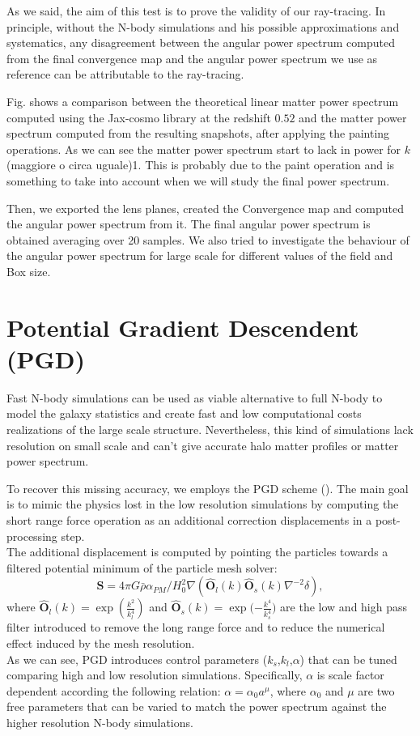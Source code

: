 \documentclass[twocolumn,twocolappendix]{aastex63}
\begin{document}
As we said, the aim of this test is to prove the validity of our ray-tracing. In principle, without the N-body simulations and his possible approximations and systematics, any disagreement between the angular power spectrum computed from the final convergence map
and the angular power spectrum we use as reference can be attributable to the ray-tracing.

Fig. shows a comparison between the theoretical linear matter power spectrum computed using the Jax-cosmo library at the redshift $0.52$ and the matter power spectrum computed from the resulting snapshots, after applying the painting operations. As we can see the matter power spectrum start to lack in power for $k$(maggiore o circa uguale)1. This is probably due to the paint operation and is something to take into account when we will study the final power spectrum.

Then, we exported the lens planes, created the Convergence map and computed the angular power spectrum from it. The final angular power spectrum is obtained averaging over 20 samples.
We also tried to investigate the behaviour of the angular power spectrum for large scale for different values of the field and Box size.

\section{Potential Gradient Descendent (PGD)}    
Fast N-body simulations can be used as viable alternative to full N-body to model the galaxy statistics and create fast and low computational costs realizations of the large scale structure. Nevertheless, this kind of simulations lack resolution on small scale and can't give accurate halo matter profiles or matter power spectrum. 


To recover this missing accuracy, we employs the PGD scheme (\citet{Dai_2018}). 
The main goal is to mimic the physics lost in the low resolution simulations by computing the short range force operation as an additional correction displacements in a post-processing step. \\
The additional displacement is computed by pointing the particles towards a filtered potential minimum of the particle mesh solver:
\begin{equation}
    \textbf{S}=4\pi G \bar{\rho}\alpha_{PM}/H_0^2 \nabla(
   \hat{\textbf{O}}_l(k)
     \hat{\textbf{O}}_s(k)
    \nabla^{-2}\delta),
\end{equation}
where $\hat{\textbf{O}}_l(k)= \exp{(\frac{k^2}{k^4_l})}$ and $\hat{\textbf{O}}_s(k)= \exp{(-\frac{k^4}{k^4_s}})$ are the low and high pass filter introduced to remove the long range force and to reduce the numerical effect induced by the mesh resolution. \\
As we can see, PGD introduces control parameters ($k_s$,$k_l$,$\alpha$) that can be tuned comparing high and low resolution simulations.
Specifically, $\alpha$ is scale factor dependent according the following relation: $\alpha=\alpha_0a^{\mu}$, where $\alpha_0$ and $\mu$ are two free parameters that can be varied to match the power spectrum against the higher resolution N-body simulations.
\end{document}
